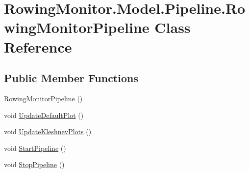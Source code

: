 \hypertarget{class_rowing_monitor_1_1_model_1_1_pipeline_1_1_rowing_monitor_pipeline}{}\section{Rowing\+Monitor.\+Model.\+Pipeline.\+Rowing\+Monitor\+Pipeline Class Reference}
\label{class_rowing_monitor_1_1_model_1_1_pipeline_1_1_rowing_monitor_pipeline}
\subsection*{Public Member Functions}
\begin{DoxyCompactItemize}
\item 
\hyperlink{class_rowing_monitor_1_1_model_1_1_pipeline_1_1_rowing_monitor_pipeline_ae4e9b2608fbff1b0d6c368fab6c57d27}{Rowing\+Monitor\+Pipeline} ()
\item 
void \hyperlink{class_rowing_monitor_1_1_model_1_1_pipeline_1_1_rowing_monitor_pipeline_a383d38318d68d63b2f3fdf274a08e8fe}{Update\+Default\+Plot} ()
\item 
void \hyperlink{class_rowing_monitor_1_1_model_1_1_pipeline_1_1_rowing_monitor_pipeline_a22a2b4bee6eb1775ac01affba7e36857}{Update\+Kleshnev\+Plots} ()
\item 
void \hyperlink{class_rowing_monitor_1_1_model_1_1_pipeline_1_1_rowing_monitor_pipeline_a882b380461e2c680367f6e42aa11812f}{Start\+Pipeline} ()
\item 
void \hyperlink{class_rowing_monitor_1_1_model_1_1_pipeline_1_1_rowing_monitor_pipeline_a301384eb3dc9c1221c61e5a1a4e540fd}{Stop\+Pipeline} ()
\end{DoxyCompactItemize}
